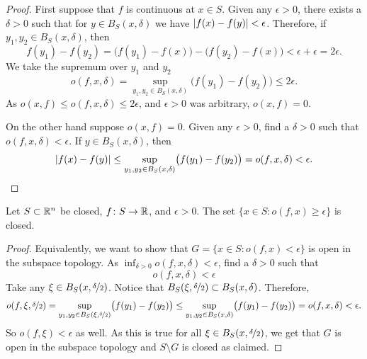 \begin{proof}
First suppose that $f$ is continuous at $x \in S$.  Given any $\epsilon > 0$,
there exists a $\delta > 0$ such that for $y \in B_S(x,\delta)$
we have $\lvert {f(x)-f(y)} \rvert < \epsilon$.  Therefore, if $y_1,y_2 \in
B_S(x,\delta)$, then
\begin{equation*}
f(y_1)-f(y_2) =
\bigl(f(y_1)-f(x)\bigr)-\bigl(f(y_2)-f(x)\bigr) < \epsilon + \epsilon = 2 \epsilon .
\end{equation*}
We take the supremum over $y_1$ and $y_2$
\begin{equation*}
o(f,x,\delta) = 
\sup_{y_1,y_2 \in B_S(x,\delta)} \bigl(f(y_1)-f(y_2)\bigr)
\leq
2 \epsilon .
\end{equation*}
As $o(x,f) \leq o(f,x,\delta) \leq 2\epsilon$, and $\epsilon > 0$ was arbitrary,
$o(x,f) = 0$.

On the other hand suppose $o(x,f) = 0$.  Given any $\epsilon > 0$,
find a $\delta > 0$ such that $o(f,x,\delta) < \epsilon$.  If
$y \in B_S(x,\delta)$, then
\begin{equation*}
\lvert {f(x)-f(y)} \rvert
\leq
\sup_{y_1,y_2 \in B_S(x,\delta)} \bigl(f(y_1)-f(y_2)\bigr)
=
o(f,x,\delta) < \epsilon. \qedhere
\end{equation*}
\end{proof}

\begin{prop} \label{prop:seclosed}
Let $S \subset {\mathbb{R}}^n$ be closed,
$f \colon S \to {\mathbb{R}}$, and $\epsilon > 0$.
The set $\bigl\{ x \in S : o(f,x) \geq \epsilon \bigr\}$ is closed.
\end{prop}

\begin{proof}
Equivalently, we want to show that
$G = \bigl\{ x \in S : o(f,x) < \epsilon \bigr\}$ is open in the subspace topology.
As $\inf_{\delta > 0} o(f,x,\delta) < \epsilon$, find a $\delta > 0$ such
that
\begin{equation*}
o(f,x,\delta) < \epsilon
\end{equation*}
Take any $\xi \in B_S(x,\nicefrac{\delta}{2})$.  Notice that
$B_S(\xi,\nicefrac{\delta}{2}) \subset B_S(x,\delta)$.  Therefore,
\begin{equation*}
o(f,\xi,\nicefrac{\delta}{2}) =
\sup_{y_1,y_2 \in B_S(\xi,\nicefrac{\delta}{2})} \bigl(f(y_1)-f(y_2)\bigr) 
\leq
\sup_{y_1,y_2 \in B_S(x,\delta)} \bigl(f(y_1)-f(y_2)\bigr) = o(f,x,\delta) <
\epsilon .
\end{equation*}
So $o(f,\xi) < \epsilon$ as well.  As this is true for all $\xi \in
B_S(x,\nicefrac{\delta}{2})$, we get that $G$ is open in the subspace
topology and $S \setminus G$ is closed as claimed.
\end{proof}


